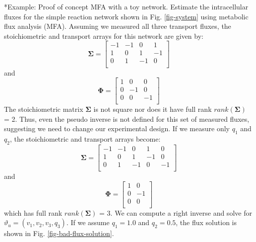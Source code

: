 \documentclass[11pt]{article}
\makeatletter
\theoremstyle{definition}
\renewcommand\subsubsection{\@startsection
	{subsubsection}{2}{0mm}
	{-0.05in}
	{-0.5\baselineskip}
	{\normalfont\normalsize\itshape}}
\makeatother
\begin{document}
\subsubsection*{Example: Proof of concept MFA with a toy network.}
Estimate the intracellular fluxes for the simple reaction network shown in Fig. \eqref{fig-system} using metabolic flux analysis (MFA).
Assuming we measured all three transport fluxes, the stoichiometric and transport arrays for this network are given by:
\begin{equation}
\mathbf{\Sigma} =
\begin{bmatrix}
	-1 & -1 & 0 & 1 \\
	1 & 0 & 1 & -1 \\
	0 & 1 & -1 & 0 \\
\end{bmatrix}
\end{equation} and
\begin{equation}
	\mathbf{\Phi} =
	\begin{bmatrix}
		1 & 0 & 0 \\
		0 & -1 & 0 \\
		0 & 0 & -1 \\
	\end{bmatrix}
\end{equation}
The stoichiometric matrix $\mathbf{\Sigma}$ is not square nor does it have full rank $rank\left(\mathbf{\Sigma}\right)$ = 2.
Thus, even the pseudo inverse is not defined for this set of measured fluxes, suggesting we need to change our experimental design.
If we measure only $q_{1}$ and $q_{2}$, the stoichiometric and transport arrays become:
\begin{equation}
\mathbf{\Sigma} =
\begin{bmatrix}
	-1 & -1 & 0 & 1 & 0 \\
	1 & 0 & 1 & -1 & 0 \\
	0 & 1 & -1 & 0 & -1 \\
\end{bmatrix}
\end{equation} and
\begin{equation}
	\mathbf{\Phi} =
	\begin{bmatrix}
		1 & 0 \\
		0 & -1 \\
		0 & 0 \\
	\end{bmatrix}
\end{equation}which has full rank $rank\left(\mathbf{\Sigma}\right)$ = 3.
We can compute a right inverse and solve for $\vartheta_{u} = \left(v_{1},v_{2},v_{3},q_{3}\right)$.
If we assume $q_{1} = 1.0$ and $q_{2} = 0.5$, the flux solution is shown in Fig. \eqref{fig-bad-flux-solution}.
\end{document}

